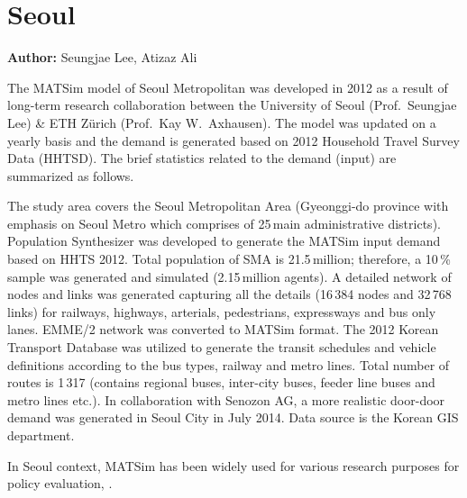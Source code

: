 \section{Seoul}
\label{sec:seoul}
\hfill \textbf{Author:} Seungjae Lee, Atizaz Ali

The MATSim model of Seoul Metropolitan was developed in 2012 as a result of long-term research collaboration between the University of Seoul (Prof.\ Seungjae Lee) \& ETH Zürich (Prof.\ Kay W.\ Axhausen). The model was updated on a yearly basis and the demand is generated based on 2012 Household Travel Survey Data (HHTSD). The brief statistics related to the demand (input) are summarized as follows. 

The study area covers the Seoul Metropolitan Area (Gyeonggi-do province with emphasis on Seoul Metro which comprises of 25\,main administrative districts). Population Synthesizer was developed to generate the MATSim input demand based on HHTS 2012. Total population of SMA is 21.5\,million; therefore, a 10\,\% sample was generated and simulated (2.15\,million agents). A detailed network of nodes and links was generated capturing all the details (16\,384 nodes and 32\,768 links) for railways, highways, arterials, pedestrians, expressways and bus only lanes. EMME/2 network was converted to MATSim format. The 2012 Korean Transport Database was utilized to generate the transit schedules and vehicle definitions according to the bus types, railway and metro lines. Total number of routes is 1\,317 (contains regional buses, inter-city buses, feeder line buses and metro lines etc.). In collaboration with Senozon AG, a more realistic door-door demand was generated in Seoul City in July 2014. Data source is the Korean GIS department.

In Seoul context, MATSim has been widely used for various research purposes for policy evaluation, \citet[see e.g.,][]{KimEtAl_IJHE_2012, LeeAli_unpub_IWUTSCD_2014}.

